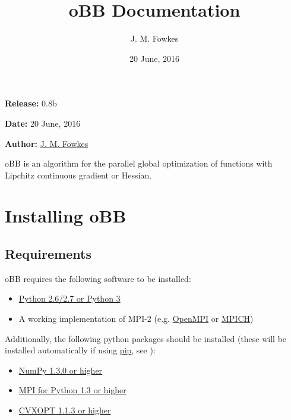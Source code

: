 \documentclass[letterpaper,11pt,openany,oneside]{sphinxmanual}
\title{oBB Documentation}
\date{20 June, 2016}
\author{J. M. Fowkes}
\begin{document}
\maketitle
\tableofcontents
{}\label{index::doc}


\textbf{Release:} 0.8b

\textbf{Date:} 20 June, 2016

\textbf{Author:} \href{mailto:jaroslav.fowkes@ed.ac.uk}{J. M. Fowkes}

oBB is an algorithm for the parallel global optimization of functions with Lipchitz continuous gradient or Hessian.


\chapter{Installing oBB}
\label{install:installing-obb}\label{install::doc}\label{install:overlapping-branch-and-bound}

\section{Requirements}
\label{install:requirements}
oBB requires the following software to be installed:
\begin{itemize}
\item {} 
\href{http://www.python.org/}{Python 2.6/2.7 or Python 3}

\item {} 
A working implementation of MPI-2 (e.g. \href{http://www.open-mpi.org/}{OpenMPI} or \href{http://www.mpich.org/}{MPICH})

\end{itemize}

Additionally, the following python packages should be installed (these will be installed automatically if using \href{http://www.pip-installer.org/}{pip}, see {\hyperref[install:installation\string-using\string-pip]{}}):
\begin{itemize}
\item {} 
\href{http://www.numpy.org/}{NumPy 1.3.0 or higher}

\item {} 
\href{http://mpi4py.scipy.org/}{MPI for Python 1.3 or higher}

\item {} 
\href{http://cvxopt.org/}{CVXOPT 1.1.3 or higher}

\end{itemize}
\end{document}

